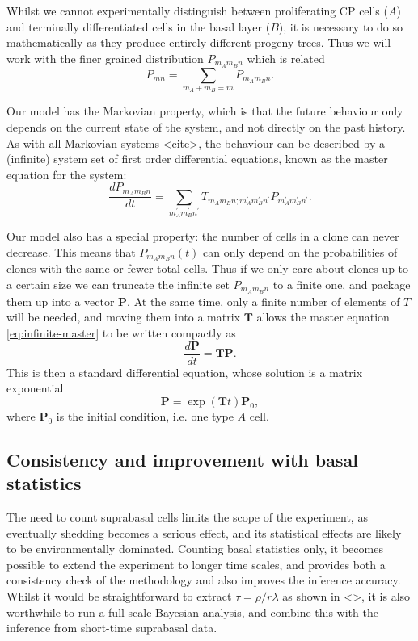 \documentclass[10pt,UKenglish]{article}
\begin{document}
Whilst we cannot experimentally distinguish between proliferating CP cells ($A$) and terminally differentiated cells in the basal layer ($B$), it is necessary to do so mathematically as they produce entirely different progeny trees. Thus we will work with the finer grained distribution $P_{m_A m_B n}$ which is related $$P_{mn} = \sum_{m_A + m_B = m} P_{m_A m_B n}.$$ 

Our model has the Markovian property, which is that the future behaviour only depends on the current state of the system, and not directly on the past history. As with all Markovian systems <cite>, the behaviour can be described by a (infinite) system set of first order differential equations, known as the master equation for the system: 
\begin{equation}
\frac{dP_{m_A m_B n}}{dt} = \sum_{m_A^\prime m_B^\prime n^\prime} T_{m_A m_B n; m_A^\prime m_B^\prime n^\prime} P_{m_A^\prime m_B^\prime n^\prime}. \label{eq:infinite-master}
\end{equation}

Our model also has a special property: the number of cells in a clone can never decrease. This means that $P_{m_A m_B n}(t)$ can only depend on the probabilities of clones with the same or fewer total cells. Thus if we only care about clones up to a certain size we can truncate the infinite set $P_{m_A m_B n}$ to a finite one, and package them up into a vector $\mathbf P$. At the same time, only a finite number of elements of $T$ will be needed, and moving them into a matrix $\mathbf T$ allows the master equation \eqref{eq:infinite-master} to be written compactly as $$\frac{d\mathbf P}{dt} = \mathbf{T P}.$$ This is then a standard differential equation, whose solution is a matrix exponential $$\mathbf P = \exp(\mathbf T t) \mathbf P_0,$$ where $\mathbf P_0$ is the initial condition, i.e. one type $A$ cell.

\subsection{\label{sec:ball-plane}Consistency and improvement with basal statistics}

The need to count suprabasal cells limits the scope of the experiment, as eventually shedding becomes a serious effect, and its statistical effects are likely to be environmentally dominated. Counting basal statistics only, it becomes possible to extend the experiment to longer time scales, and provides both a consistency check of the methodology and also improves the inference accuracy. Whilst it would be straightforward to extract $\tau = \rho/r\lambda$ as shown in <>, it is also worthwhile to run a full-scale Bayesian analysis, and combine this with the inference from short-time suprabasal data.
\end{document}
